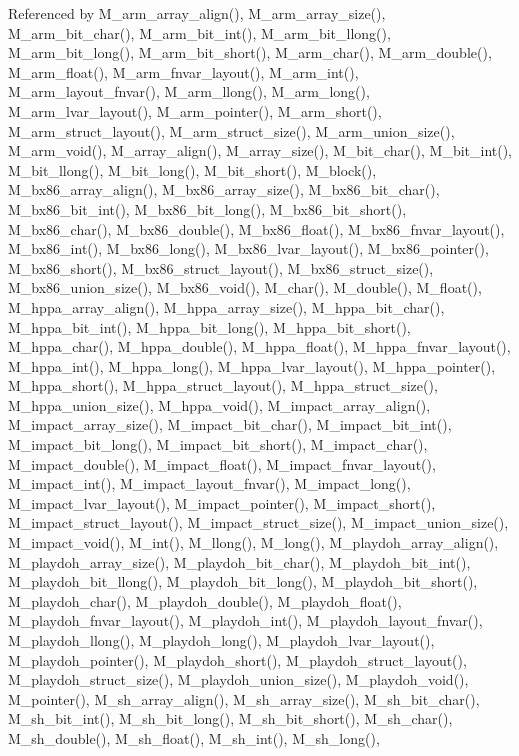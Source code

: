 Referenced by M\_\-arm\_\-array\_\-align(), M\_\-arm\_\-array\_\-size(), M\_\-arm\_\-bit\_\-char(), M\_\-arm\_\-bit\_\-int(), M\_\-arm\_\-bit\_\-llong(), M\_\-arm\_\-bit\_\-long(), M\_\-arm\_\-bit\_\-short(), M\_\-arm\_\-char(), M\_\-arm\_\-double(), M\_\-arm\_\-float(), M\_\-arm\_\-fnvar\_\-layout(), M\_\-arm\_\-int(), M\_\-arm\_\-layout\_\-fnvar(), M\_\-arm\_\-llong(), M\_\-arm\_\-long(), M\_\-arm\_\-lvar\_\-layout(), M\_\-arm\_\-pointer(), M\_\-arm\_\-short(), M\_\-arm\_\-struct\_\-layout(), M\_\-arm\_\-struct\_\-size(), M\_\-arm\_\-union\_\-size(), M\_\-arm\_\-void(), M\_\-array\_\-align(), M\_\-array\_\-size(), M\_\-bit\_\-char(), M\_\-bit\_\-int(), M\_\-bit\_\-llong(), M\_\-bit\_\-long(), M\_\-bit\_\-short(), M\_\-block(), M\_\-bx86\_\-array\_\-align(), M\_\-bx86\_\-array\_\-size(), M\_\-bx86\_\-bit\_\-char(), M\_\-bx86\_\-bit\_\-int(), M\_\-bx86\_\-bit\_\-long(), M\_\-bx86\_\-bit\_\-short(), M\_\-bx86\_\-char(), M\_\-bx86\_\-double(), M\_\-bx86\_\-float(), M\_\-bx86\_\-fnvar\_\-layout(), M\_\-bx86\_\-int(), M\_\-bx86\_\-long(), M\_\-bx86\_\-lvar\_\-layout(), M\_\-bx86\_\-pointer(), M\_\-bx86\_\-short(), M\_\-bx86\_\-struct\_\-layout(), M\_\-bx86\_\-struct\_\-size(), M\_\-bx86\_\-union\_\-size(), M\_\-bx86\_\-void(), M\_\-char(), M\_\-double(), M\_\-float(), M\_\-hppa\_\-array\_\-align(), M\_\-hppa\_\-array\_\-size(), M\_\-hppa\_\-bit\_\-char(), M\_\-hppa\_\-bit\_\-int(), M\_\-hppa\_\-bit\_\-long(), M\_\-hppa\_\-bit\_\-short(), M\_\-hppa\_\-char(), M\_\-hppa\_\-double(), M\_\-hppa\_\-float(), M\_\-hppa\_\-fnvar\_\-layout(), M\_\-hppa\_\-int(), M\_\-hppa\_\-long(), M\_\-hppa\_\-lvar\_\-layout(), M\_\-hppa\_\-pointer(), M\_\-hppa\_\-short(), M\_\-hppa\_\-struct\_\-layout(), M\_\-hppa\_\-struct\_\-size(), M\_\-hppa\_\-union\_\-size(), M\_\-hppa\_\-void(), M\_\-impact\_\-array\_\-align(), M\_\-impact\_\-array\_\-size(), M\_\-impact\_\-bit\_\-char(), M\_\-impact\_\-bit\_\-int(), M\_\-impact\_\-bit\_\-long(), M\_\-impact\_\-bit\_\-short(), M\_\-impact\_\-char(), M\_\-impact\_\-double(), M\_\-impact\_\-float(), M\_\-impact\_\-fnvar\_\-layout(), M\_\-impact\_\-int(), M\_\-impact\_\-layout\_\-fnvar(), M\_\-impact\_\-long(), M\_\-impact\_\-lvar\_\-layout(), M\_\-impact\_\-pointer(), M\_\-impact\_\-short(), M\_\-impact\_\-struct\_\-layout(), M\_\-impact\_\-struct\_\-size(), M\_\-impact\_\-union\_\-size(), M\_\-impact\_\-void(), M\_\-int(), M\_\-llong(), M\_\-long(), M\_\-playdoh\_\-array\_\-align(), M\_\-playdoh\_\-array\_\-size(), M\_\-playdoh\_\-bit\_\-char(), M\_\-playdoh\_\-bit\_\-int(), M\_\-playdoh\_\-bit\_\-llong(), M\_\-playdoh\_\-bit\_\-long(), M\_\-playdoh\_\-bit\_\-short(), M\_\-playdoh\_\-char(), M\_\-playdoh\_\-double(), M\_\-playdoh\_\-float(), M\_\-playdoh\_\-fnvar\_\-layout(), M\_\-playdoh\_\-int(), M\_\-playdoh\_\-layout\_\-fnvar(), M\_\-playdoh\_\-llong(), M\_\-playdoh\_\-long(), M\_\-playdoh\_\-lvar\_\-layout(), M\_\-playdoh\_\-pointer(), M\_\-playdoh\_\-short(), M\_\-playdoh\_\-struct\_\-layout(), M\_\-playdoh\_\-struct\_\-size(), M\_\-playdoh\_\-union\_\-size(), M\_\-playdoh\_\-void(), M\_\-pointer(), M\_\-sh\_\-array\_\-align(), M\_\-sh\_\-array\_\-size(), M\_\-sh\_\-bit\_\-char(), M\_\-sh\_\-bit\_\-int(), M\_\-sh\_\-bit\_\-long(), M\_\-sh\_\-bit\_\-short(), M\_\-sh\_\-char(), M\_\-sh\_\-double(), M\_\-sh\_\-float(), M\_\-sh\_\-int(), M\_\-sh\_\-long(), 